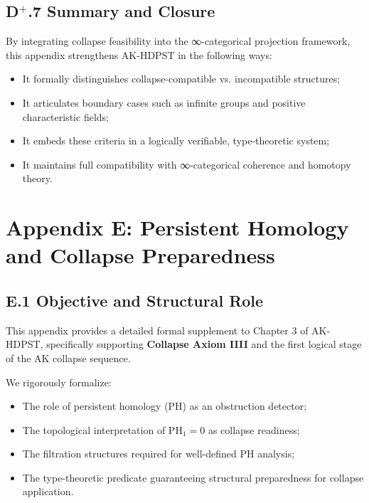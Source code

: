 \documentclass[11pt]{article}
\begin{document}
\subsection*{D$^{+}$.7 Summary and Closure}

By integrating collapse feasibility into the ∞-categorical projection framework, this appendix strengthens AK-HDPST in the following ways:

\begin{itemize}
\item It formally distinguishes collapse-compatible vs. incompatible structures;
\item It articulates boundary cases such as infinite groups and positive characteristic fields;
\item It embeds these criteria in a logically verifiable, type-theoretic system;
\item It maintains full compatibility with ∞-categorical coherence and homotopy theory.
\end{itemize}



\section*{Appendix E: Persistent Homology and Collapse Preparedness}

\subsection*{E.1 Objective and Structural Role}

This appendix provides a detailed formal supplement to Chapter 3 of AK-HDPST, specifically supporting \textbf{Collapse Axiom IIII} and the first logical stage of the AK collapse sequence.

We rigorously formalize:

\begin{itemize}
    \item The role of persistent homology (PH) as an obstruction detector;
    \item The topological interpretation of \( \mathrm{PH}_1 = 0 \) as collapse readiness;
    \item The filtration structures required for well-defined PH analysis;
    \item The type-theoretic predicate guaranteeing structural preparedness for collapse application.
\end{itemize}
\end{document}

